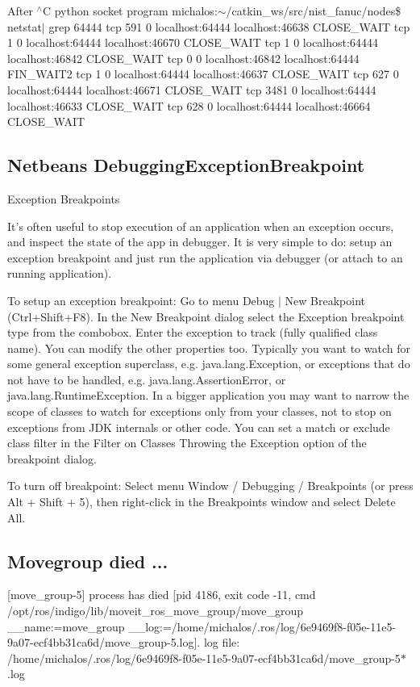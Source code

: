 After $^\wedge$\-C python socket program michalos\-:$\sim$/catkin\-\_\-ws/src/nist\-\_\-fanuc/nodes\$ netstat$\vert$ grep 64444 tcp 591 0 localhost\-:64444 localhost\-:46638 C\-L\-O\-S\-E\-\_\-\-W\-A\-I\-T tcp 1 0 localhost\-:64444 localhost\-:46670 C\-L\-O\-S\-E\-\_\-\-W\-A\-I\-T tcp 1 0 localhost\-:64444 localhost\-:46842 C\-L\-O\-S\-E\-\_\-\-W\-A\-I\-T tcp 0 0 localhost\-:46842 localhost\-:64444 F\-I\-N\-\_\-\-W\-A\-I\-T2 tcp 1 0 localhost\-:64444 localhost\-:46637 C\-L\-O\-S\-E\-\_\-\-W\-A\-I\-T tcp 627 0 localhost\-:64444 localhost\-:46671 C\-L\-O\-S\-E\-\_\-\-W\-A\-I\-T tcp 3481 0 localhost\-:64444 localhost\-:46633 C\-L\-O\-S\-E\-\_\-\-W\-A\-I\-T tcp 628 0 localhost\-:64444 localhost\-:46664 C\-L\-O\-S\-E\-\_\-\-W\-A\-I\-T

\subsection*{Netbeans Debugging\-Exception\-Breakpoint }

Exception Breakpoints

It's often useful to stop execution of an application when an exception occurs, and inspect the state of the app in debugger. It is very simple to do\-: setup an exception breakpoint and just run the application via debugger (or attach to an running application).

To setup an exception breakpoint\-: Go to menu Debug $\vert$ New Breakpoint (Ctrl+\-Shift+\-F8). In the New Breakpoint dialog select the Exception breakpoint type from the combobox. Enter the exception to track (fully qualified class name). You can modify the other properties too. Typically you want to watch for some general exception superclass, e.\-g. java.\-lang.\-Exception, or exceptions that do not have to be handled, e.\-g. java.\-lang.\-Assertion\-Error, or java.\-lang.\-Runtime\-Exception. In a bigger application you may want to narrow the scope of classes to watch for exceptions only from your classes, not to stop on exceptions from J\-D\-K internals or other code. You can set a match or exclude class filter in the Filter on Classes Throwing the Exception option of the breakpoint dialog.

To turn off breakpoint\-: Select menu Window / Debugging / Breakpoints (or press Alt + Shift + 5), then right-\/click in the Breakpoints window and select Delete All.

\subsection*{Movegroup died ... }

\mbox{[}move\-\_\-group-\/5\mbox{]} process has died \mbox{[}pid 4186, exit code -\/11, cmd /opt/ros/indigo/lib/moveit\-\_\-ros\-\_\-move\-\_\-group/move\-\_\-group \-\_\-\-\_\-name\-:=move\-\_\-group \-\_\-\-\_\-log\-:=/home/michalos/.ros/log/6e9469f8-\/f05e-\/11e5-\/9a07-\/ecf4bb31ca6d/move\-\_\-group-\/5.\-log\mbox{]}. log file\-: /home/michalos/.ros/log/6e9469f8-\/f05e-\/11e5-\/9a07-\/ecf4bb31ca6d/move\-\_\-group-\/5$\ast$.log 